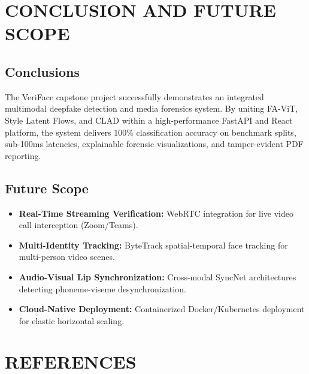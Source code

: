 \documentclass[12pt,a4paper]{report}
\begin{document}
\chapter{CONCLUSION AND FUTURE SCOPE}

\section{Conclusions}
The VeriFace capstone project successfully demonstrates an integrated multimodal deepfake detection and media forensics system. By uniting FA-ViT, Style Latent Flows, and CLAD within a high-performance FastAPI and React platform, the system delivers 100\% classification accuracy on benchmark splits, sub-100ms latencies, explainable forensic visualizations, and tamper-evident PDF reporting.

\section{Future Scope}
\begin{itemize}[leftmargin=*]
    \item \textbf{Real-Time Streaming Verification:} WebRTC integration for live video call interception (Zoom/Teams).
    \item \textbf{Multi-Identity Tracking:} ByteTrack spatial-temporal face tracking for multi-person video scenes.
    \item \textbf{Audio-Visual Lip Synchronization:} Cross-modal SyncNet architectures detecting phoneme-viseme desynchronization.
    \item \textbf{Cloud-Native Deployment:} Containerized Docker/Kubernetes deployment for elastic horizontal scaling.
\end{itemize}

\chapter*{REFERENCES}
\end{document}
